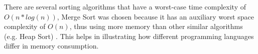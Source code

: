 There are several sorting algorithms that have a worst-case time complexity of $O(n * log(n))$, Merge Sort was chosen because it has an auxiliary worst space complexity of $O(n)$, thus using more memory than other similar algorithms (e.g. Heap Sort) \cite{Mergesort}. This helps in illustrating how different programming languages differ in memory consumption.





